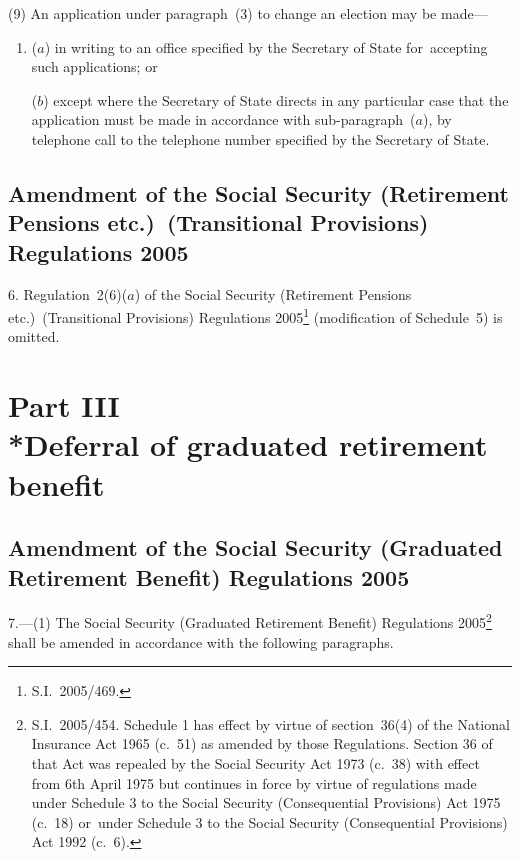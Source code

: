 \documentclass[12pt,a4paper]{article}
\begin{document}
(9) An application under paragraph~(3) to change an election may be made—
\begin{enumerate}\item[]
($a$) in writing to an office specified by the Secretary of State for~accepting such applications; or

($b$) except where the Secretary of State directs in any particular case that the application must be made in accordance with sub-paragraph~($a$), by telephone call to the telephone number specified by the Secretary of State.
\end{enumerate}

\subsection[6. Amendment of the Social Security (Retirement Pensions etc.)\ (Transitional Provisions) Regulations 2005]{Amendment of the Social Security (Retirement Pensions etc.)\ (Transitional Provisions) Regulations 2005}

6.  Regulation~2(6)($a$)  of the Social Security (Retirement Pensions etc.)\ (Transitional Provisions) Regulations 2005\footnote{S.I.~2005/469.} (modification of Schedule~5) is omitted.

\section[Part III --- Deferral of graduated retirement benefit]{Part III\\*Deferral of graduated retirement benefit}

\renewcommand\parthead{--- Part III}

\subsection[7. Amendment of the Social Security (Graduated Retirement Benefit) Regulations 2005]{Amendment of the Social Security (Graduated Retirement Benefit) Regulations 2005}

7.---(1)  The Social Security (Graduated Retirement Benefit) Regulations 2005\footnote{S.I.~2005/454. Schedule 1 has effect by virtue of section~36(4) of the National Insurance Act 1965 (c.~51) as amended by those Regulations. Section 36 of that Act was repealed by the Social Security Act 1973 (c.~38) with effect from 6th April 1975 but continues in force by virtue of regulations made under Schedule 3 to the Social Security (Consequential Provisions) Act 1975 (c.~18) or~under Schedule 3 to the Social Security (Consequential Provisions) Act 1992 (c.~6).} shall be amended in accordance with the following paragraphs.
\end{document}
